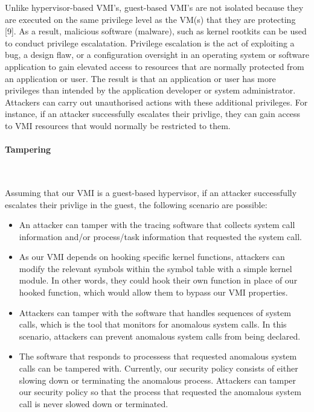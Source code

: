 \documentclass{report}
\begin{document}
\begin{spacing}{1.5}
{\large
Unlike hypervisor-based VMI's, guest-based VMI's are not isolated because they are executed on the same privilege level as the VM(s) that they are protecting [9]. As a result, malicious software (malware), such as kernel rootkits can be used to conduct privilege escalatation. Privilege escalation is the act of exploiting a bug, a design flaw, or a configuration oversight in an operating system or software application to gain elevated access to resources that are normally protected from an application or user. The result is that an application or user has more privileges than intended by the application developer or system administrator. Attackers can carry out unauthorised actions with these additional privileges. For instance, if an attacker successfully escalates their privlige, they can gain access to VMI resources that would normally be restricted to them.
\newline
}

\paragraph{Tampering}\mbox{}\\


{\large
Assuming that our VMI is a guest-based hypervisor, if an attacker successfully escalates their privlige in the guest, the following scenario are possible:

\begin{itemize}
\item An attacker can tamper with the tracing software that collects system call information and/or process/task information that requested the system call. 

\item As our VMI depends on hooking specific kernel functions, attackers can modify the relevant symbols within the symbol table with a simple kernel module. In other words, they could hook their own function in place of our hooked function, which would allow them to bypass our VMI properties. 

\item Attackers can tamper with the software that handles sequences of system calls, which is the tool that monitors for anomalous system calls. In this scenario, attackers can prevent anomalous system calls from being declared.

\item The software that responds to processess that requested anomalous system calls can be tampered with. Currently, our security policy consists of either slowing down or terminating the anomalous process. Attackers can tamper our security policy so that the process that requested the anomalous system call is never slowed down or terminated.


\end{itemize}}
\end{spacing}
\end{document}
